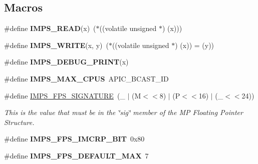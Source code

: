 \subsection*{Macros}
\begin{DoxyCompactItemize}
\item 
\mbox{\label{smp-imps_8h_a178235e2a30df3d2c411b923cf72df4e}} 
\#define {\bfseries I\+M\+P\+S\+\_\+\+R\+E\+AD}(x)~($\ast$((volatile unsigned $\ast$) (x)))
\item 
\mbox{\label{smp-imps_8h_a1e4a951e4766f4c9c3e7ef71d7a0d00c}} 
\#define {\bfseries I\+M\+P\+S\+\_\+\+W\+R\+I\+TE}(x,  y)~($\ast$((volatile unsigned $\ast$) (x)) = (y))
\item 
\mbox{\label{smp-imps_8h_ae40da8814e8f63049c2dade22bb0dfe3}} 
\#define {\bfseries I\+M\+P\+S\+\_\+\+D\+E\+B\+U\+G\+\_\+\+P\+R\+I\+NT}(x)
\item 
\mbox{\label{smp-imps_8h_afcbbc21d3ec3697a2d41076ce3a36cea}} 
\#define {\bfseries I\+M\+P\+S\+\_\+\+M\+A\+X\+\_\+\+C\+P\+US}~A\+P\+I\+C\+\_\+\+B\+C\+A\+S\+T\+\_\+\+ID
\item 
\mbox{\label{smp-imps_8h_a561b5fb11447074fb80eaed64dbcfd77}} 
\#define \mbox{\hyperlink{smp-imps_8h_a561b5fb11447074fb80eaed64dbcfd77}{I\+M\+P\+S\+\_\+\+F\+P\+S\+\_\+\+S\+I\+G\+N\+A\+T\+U\+RE}}~(\textquotesingle{}\+\_\+\textquotesingle{} $\vert$ (\textquotesingle{}M\textquotesingle{}$<$$<$8) $\vert$ (\textquotesingle{}P\textquotesingle{}$<$$<$16) $\vert$ (\textquotesingle{}\+\_\+\textquotesingle{}$<$$<$24))
\begin{DoxyCompactList}\small\item\em This is the value that must be in the \char`\"{}sig\char`\"{} member of the MP Floating Pointer Structure. \end{DoxyCompactList}\item 
\mbox{\label{smp-imps_8h_a87138c5e6a6905a9fff26764712d51e0}} 
\#define {\bfseries I\+M\+P\+S\+\_\+\+F\+P\+S\+\_\+\+I\+M\+C\+R\+P\+\_\+\+B\+IT}~0x80
\item 
\mbox{\label{smp-imps_8h_a414e98557f5ab5ee1801fe8456b4a75c}} 
\#define {\bfseries I\+M\+P\+S\+\_\+\+F\+P\+S\+\_\+\+D\+E\+F\+A\+U\+L\+T\+\_\+\+M\+AX}~7
$$
\end{DoxyCompactItemize}
